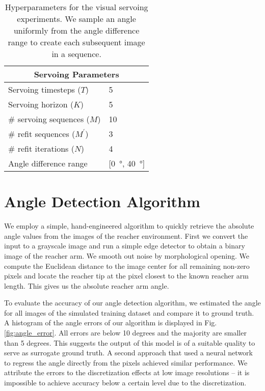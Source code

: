 \documentclass{article} %
\begin{document}
\begin{table}
\caption{Hyperparameters for the visual servoing experiments. We sample an angle uniformly from the angle difference range to create each subsequent image in a sequence.}
  \centering
  \begin{tabular}{ll}
    \toprule
    \multicolumn{2}{c}{Servoing Parameters}\\
    \midrule
    Servoing timesteps ($T$) & 5  \\
    Servoing horizon ($K$) & 5 \\
    \# servoing sequences ($M$) & 10  \\
    \# refit sequences ($M^\prime$) & 3 \\
    \# refit iterations ($N$) & 4 \\
    Angle difference range & [\SI{0}{\degree}, \SI{40}{\degree}] \\
    \bottomrule
  \end{tabular} 
\label{tab:vs_param}
\end{table}\newpage\section{Angle Detection Algorithm}\label{app:angdet}

We employ a simple, hand-engineered algorithm to quickly retrieve the absolute angle values from the images of the reacher environment. First we convert the input to a grayscale image and run a simple edge detector to obtain a binary image of the reacher arm. We smooth out noise by morphological opening. We compute the Euclidean distance to the image center for all remaining non-zero pixels and locate the reacher tip at the pixel closest to the known reacher arm length. This gives us the absolute reacher arm angle.

To evaluate the accuracy of our angle detection algorithm, we estimated the angle for all images of the simulated training dataset and compare it to ground truth. A histogram of the angle errors of our algorithm is displayed in Fig. \ref{fig:angle_error}. All errors are below 10 degrees and the majority are smaller than 5 degrees. This suggests the output of this model is of a suitable quality to serve as surrogate ground truth. A second approach that used a neural network to regress the angle directly from the pixels achieved similar performance. We attribute the errors to the discretization effects at low image resolutions -- it is impossible to achieve accuracy below a certain level due to the discretization.
\end{document}
